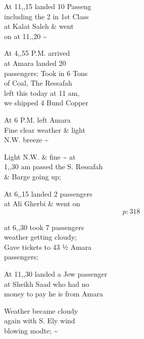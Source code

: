 \documentclass{report}
\begin{document}
	\par{
 	At 11,,15 landed 10 Passeng\ \\including the 2 in 1st Class\ \\at Kalat Saleh \& went\ \\on at 11,,20 \~{}\ \\
	}

	\par{
 	At 4,,55 P.M. arrived\ \\at Amara landed 20\ \\passengers; Took in 6 Tons\ \\of Coal, The Ressafah\ \\left this today at 11 am,\ \\we shipped 4 Bund Copper\ \\
	}

	\par{
 	At 6 P.M. left Amara\ \\Fine clear weather \& light\ \\N.W. breeze \~{}\ \\
	}

	\par{
 	Light N.W. \& fine \~{} at\ \\1,,30 am passed the S. Ressafah\ \\\& Barge going up;\ \\
	}

	\par{
 	At 6,,15 landed 2 passengers\ \\at Ali Gherbi \& went on\ \\
  \[p: 318 \]

	}

	\par{
 	at 6,,30 took 7 passengers\ \\weather getting cloudy;\ \\Gave tickets to 43 ½ Amara\ \\passengers;\ \\
	}

	\par{
 	At 11,,30 landed a Jew passenger\ \\at Sheikh Saad who had no\ \\money to pay he is from Amara\ \\
	}

	\par{
 	Weather became cloudy\ \\again with S. Ely wind\ \\blowing modte; \~{}\ \\
	}
\end{document}

